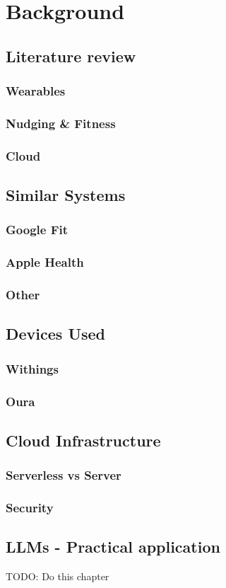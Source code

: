 \chapter{Background}
\label{cha:background}
\section{Literature review}
\subsection{Wearables}
\subsection{Nudging \& Fitness}
\subsection{Cloud}
\section{Similar Systems}
\label{section:similarSystems}
\subsection{Google Fit}
\subsection{Apple Health}
\subsection{Other}
\section{Devices Used}
\subsection{Withings}
\subsection{Oura}
\section{Cloud Infrastructure}
\subsection{Serverless vs Server}
\subsection{Security}
\section{LLMs - Practical application}


TODO: Do this chapter